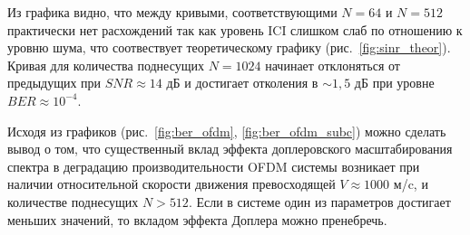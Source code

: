 Из графика видно, что между кривыми, соответствующими $N = 64$ и $N = 512$ практически нет 
расхождений так как уровень ICI слишком слаб по отношению к уровню шума,
что соотвествует теоретическому графику (рис.~\ref{fig:sinr_theor}). Кривая для количества поднесущих
$N = 1024$ начинает отклоняться от предыдущих при $SNR \approx 14$ дБ и достигает отколения в $\sim 1,5$ дБ при
уровне $BER \approx 10^{-4}$.

Исходя из графиков (рис.~\ref{fig:ber_ofdm}, \ref{fig:ber_ofdm_subc}) можно сделать вывод
о том, что существенный вклад эффекта доплеровского масштабирования спектра в деградацию
производительности OFDM системы возникает при наличии относительной скорости движения 
превосходящей $V \approx 1000$ м/c, и количестве поднесущих $N > 512$. Если в 
системе один из параметров достигает меньших значений, то вкладом эффекта Доплера можно пренебречь.